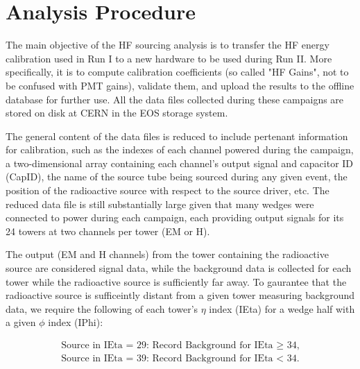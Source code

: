 \section{Analysis Procedure}
The main objective of the HF sourcing analysis is to transfer the HF energy
calibration used in Run I to a new hardware to be used during Run II. More
specifically, it is to compute calibration coefficients (so called "HF
Gains", not to be confused with PMT gains), validate them, and upload the
results to the offline database for further use. All the data files
collected during these campaigns are stored on disk at CERN in the EOS
storage system.

The general content of the data files is reduced to include pertenant
information for calibration, such as the indexes of each channel powered
during the campaign, a two-dimensional array containing each channel's
output signal and capacitor ID (CapID), the name of the source tube being
sourced during any given event, the position of the radioactive source
with respect to the source driver, etc. The reduced data file is still
substantially large given that many wedges were connected to power during
each campaign, each providing output signals for its 24 towers at two
channels per tower (EM or H).

The output (EM and H channels) from the tower containing the
radioactive source are considered signal data, while the background data
is collected for each tower while the radioactive source is sufficiently
far away. To gaurantee that the radioactive source is sufficeintly distant
from a given tower measuring background data, we require the following of
each tower's $\eta$ index (IEta) for a wedge half with a given $\phi$
index (IPhi):
\begin{center}
   \begin{eqnarray}
      \label{eq:Tower_Cuts}
      \textrm{Source in IEta = 29: Record Background for IEta $\ge$ 34,} \\
      \textrm{Source in IEta = 39: Record Background for IEta $<$ 34.} \nonumber
   \end{eqnarray}
\end{center}

